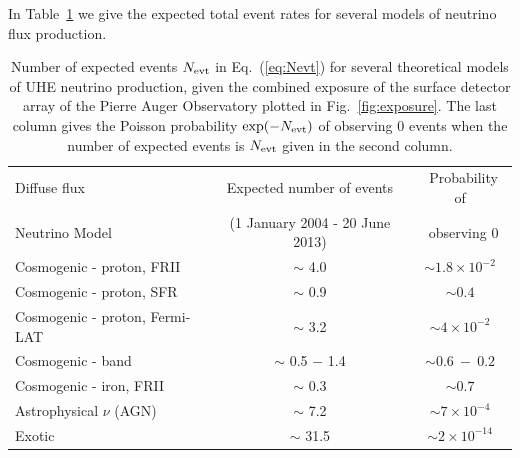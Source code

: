 \documentclass[reprint,showpacs,showkeys,amsmath,amssymb,aps,nofootinbib]{revtex4-1}
\begin{document}
In Table~\ref{tab:rates} we give the expected total event rates for several models
of neutrino flux production. 

\begin{table}[!t]
\begin{center}
\renewcommand{\arraystretch}{1.3}
\begin{tabular}{l c c} 
\hline
Diffuse flux       &  Expected number of events  & ~Probability of  \\
Neutrino Model     &  (1 January 2004 - 20 June 2013)     & ~observing $0$   \\
\hline
Cosmogenic - proton, FRII \cite{Kampert_GZK}     &  $\sim$ 4.0  & $\sim 1.8\times 10^{-2}$ \\

Cosmogenic - proton, SFR \cite{Kampert_GZK}      &  $\sim$ 0.9  & $\sim 0.4$               \\

Cosmogenic - proton, Fermi-LAT \cite{Ahlers_GZK} &  $\sim$ 3.2  & $\sim 4\times 10^{-2}$   \\

Cosmogenic - band \cite{Kotera_GZK}              &  $\sim$ 0.5 $-$ 1.4 & $\sim 0.6~-~0.2$ \\

Cosmogenic - iron, FRII \cite{Kampert_GZK}       &  $\sim$ 0.3  & $\sim 0.7$ \\

\hline

Astrophysical $\nu$ (AGN) \cite{Becker_AGN}     &  $\sim$ 7.2  & $\sim 7\times 10^{-4}$ \\

\hline

Exotic \cite{Sigl}                               &  $\sim$ 31.5  & $\sim 2\times 10^{-14}$ \\

\hline
\end{tabular}
\end{center}
\vskip -3mm
\caption{
Number of expected events $N_{\rm evt}$ in Eq.~(\ref{eq:Nevt}) for several theoretical models of UHE neutrino 
production, given the combined exposure of the surface detector array
of the Pierre Auger Observatory plotted in Fig.~\ref{fig:exposure}.
The last column gives the Poisson probability $\exp({-N_{\rm evt}})$ of observing 0 events 
when the number of expected events is $N_{\rm evt}$ given in the second column.
}
\label{tab:rates}

\end{table}
\end{document}
